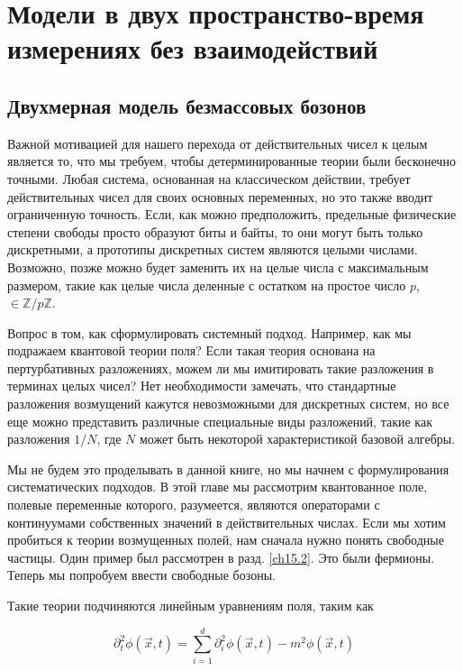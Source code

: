 \documentclass[main.tex]{subfiles}
\begin{document}
\section{Модели в двух пространство-время измерениях без взаимодействий}\label{ch17}
\subsection{Двухмерная модель безмассовых бозонов}\label{ch17.1}

Важной мотивацией для нашего перехода от действительных чисел к целым является то, что мы требуем, чтобы детерминированные теории были бесконечно точными. Любая система, основанная на классическом действии, требует действительных чисел для своих основных переменных, но это также вводит ограниченную точность. Если, как можно предположить, предельные физические степени свободы просто образуют биты и байты, то они могут быть только дискретными, а прототипы дискретных систем являются целыми числами. Возможно, позже можно будет заменить их на целые числа с максимальным размером, такие как целые числа деленные с остатком на простое число $p$, $\in\mathbb{Z} / p\mathbb{Z}$.

Вопрос в том, как сформулировать системный подход. Например, как мы подражаем квантовой теории поля? Если такая теория основана на пертурбативных разложениях, можем ли мы имитировать такие разложения в терминах целых чисел? Нет необходимости замечать, что стандартные разложения возмущений кажутся невозможными для дискретных систем, но все еще можно представить различные специальные виды разложений, такие как разложения $1 / N$, где $N$ может быть некоторой характеристикой базовой алгебры.

Мы не будем это проделывать в данной книге, но мы начнем с формулирования систематических подходов. В этой главе мы рассмотрим квантованное поле, полевые переменные которого, разумеется, являются операторами с континуумами собственных значений в действительных числах. Если мы хотим пробиться к теории возмущенных полей, нам сначала нужно понять свободные частицы. Один пример был рассмотрен в разд. \ref{ch15.2}. Это были фермионы. Теперь мы попробуем ввести свободные бозоны.

Такие теории подчиняются линейным уравнениям поля, таким как

\begin{equation}\label{17.1}
	\partial_{t}^{2} \phi(\vec{x}, t)=\sum_{i=1}^{d} \partial_{i}^{2} \phi(\vec{x}, t)-m^{2} \phi(\vec{x}, t)
\end{equation}
\end{document}
